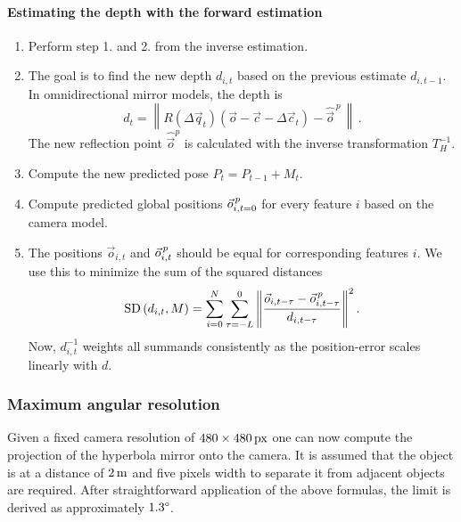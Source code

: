 \paragraph{Estimating the depth with the forward estimation}
\begin{enumerate}
  \item Perform step 1. and 2. from the inverse estimation.
  \item The goal is to find the new depth $d_{i, t}$ based on the previous estimate $d_{i, t-1}$.
    In omnidirectional mirror models, the depth is
    \[{d_{t} = \left\lVert R \left( \Delta \vec{q}_{t} \right) \left( \vec o - \vec c - \Delta \vec c_t \right) - \hat{\vec o}^{\,p} \, \right\rVert \, \text{.}}\]
    The new reflection point $\hat{\vec o}^p$ is calculated with the inverse transformation $T^{-1}_H$.
  \item Compute the new predicted pose $P_{t} = P_{t-1} + M_{t}$.
  \item Compute predicted global positions $\vec o^{{\,p}}_{i, t=0}$ for every feature $i$ based on the camera model.
  \item The positions $\vec o_{i, t}$ and $\vec o^{{\,p}}_{i, t}$ should be equal for corresponding features $i$. We use this to minimize the sum of the squared distances
\begin{equation}
  \nonumber
  \textrm{SD} \left( d_{i, t}, M \right) = \sum_{i=0}^{N} \sum_{\tau=-L}^{0} \left\lVert \frac{ \vec o_{i,t-\tau} - \vec{o}^{{\,p}}_{i, t-\tau}}{d_{i,t-\tau}} \right\rVert^2.
\end{equation}
Now, $d_{i,t}^{-1}$ weights all summands consistently as the position-error scales linearly with $d$.
\end{enumerate}





\subsubsection{Maximum angular resolution}

Given a fixed camera resolution of $\unit[480 \times 480]{px}$ one can now compute the projection of the hyperbola mirror onto the camera. 
It is assumed that the object is at a distance of $\unit[2]{m}$ and five pixels width to separate it from adjacent objects are required. 
After straightforward application of the above formulas, the limit is derived as approximately $1.3\degree$.
